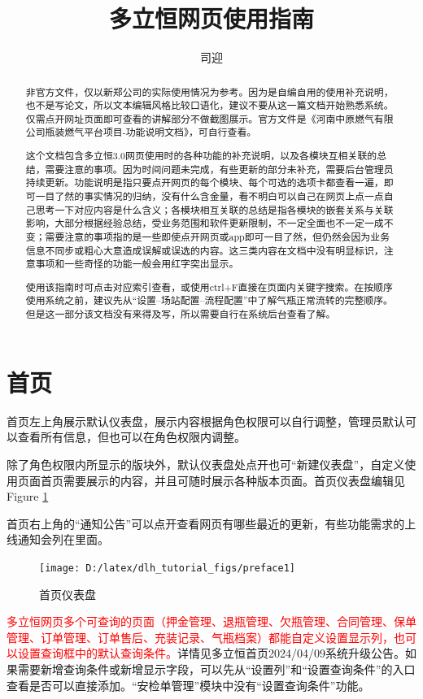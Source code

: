 \documentclass[UTF8]{ctexart}
\title{多立恒网页使用指南}
\author{司迎}
\begin{document}
\maketitle
\tableofcontents
\begin{abstract}
非官方文件，仅以新郑公司的实际使用情况为参考。因为是自编自用的使用补充说明，也不是写论文，所以文本编辑风格比较口语化，建议不要从这一篇文档开始熟悉系统。仅需点开网址页面即可查看的讲解部分不做截图展示。官方文件是《河南中原燃气有限公司瓶装燃气平台项目-功能说明文档》，可自行查看。

这个文档包含多立恒3.0网页使用时的各种功能的补充说明，以及各模块互相关联的总结，需要注意的事项。因为时间问题未完成，有些更新的部分未补充，需要后台管理员持续更新。功能说明是指只要点开网页的每个模块、每个可选的选项卡都查看一遍，即可一目了然的事实情况的归纳，没有什么含金量，看不明白可以自己在网页上点一点自己思考一下对应内容是什么含义；各模块相互关联的总结是指各模块的嵌套关系与关联影响，大部分根据经验总结，受业务范围和软件更新限制，不一定全面也不一定一成不变；需要注意的事项指的是一些即使点开网页或app即可一目了然，但仍然会因为业务信息不同步或粗心大意造成误解或误选的内容。这三类内容在文档中没有明显标识，注意事项和一些奇怪的功能一般会用红字突出显示。

使用该指南时可点击对应索引查看，或使用ctrl+F直接在页面内关键字搜索。在按顺序使用系统之前，建议先从“设置--场站配置--流程配置”中了解气瓶正常流转的完整顺序。但是这一部分该文档没有来得及写，所以需要自行在系统后台查看了解。
\end{abstract}

\section{首页}

首页左上角展示默认仪表盘，展示内容根据角色权限可以自行调整，管理员默认可以查看所有信息，但也可以在角色权限内调整。

除了角色权限内所显示的版块外，默认仪表盘处点开也可“新建仪表盘”，自定义使用页面首页需要展示的内容，并且可随时展示各种版本页面。首页仪表盘编辑见Figure \ref{fig:preface1}

首页右上角的“通知公告”可以点开查看网页有哪些最近的更新，有些功能需求的上线通知会列在里面。
\begin{figure}[h]
	\centering
	\texttt{[image: D:/latex/dlh\_tutorial\_figs/preface1]}
	\caption{首页仪表盘}
	\label{fig:preface1}
\end{figure}

\textcolor{red}{多立恒网页多个可查询的页面（押金管理、退瓶管理、欠瓶管理、合同管理、保单管理、订单管理、订单售后、充装记录、气瓶档案）都能自定义设置显示列，也可以设置查询框中的默认查询条件。}详情见多立恒首页2024/04/09系统升级公告。如果需要新增查询条件或新增显示字段，可以先从“设置列”和“设置查询条件”的入口查看是否可以直接添加。“安检单管理”模块中没有“设置查询条件”功能。
\end{document}
